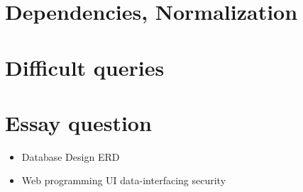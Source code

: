 \documentclass{article}
\begin{document}
\section{Dependencies, Normalization}

\section{Difficult queries}

\section{Essay question}
\begin{itemize}
	\item Database Design
		\subitem ERD
	\item Web programming
		\subitem UI
		\subitem data-interfacing		
		\subitem security
\end{itemize}
\end{document}
